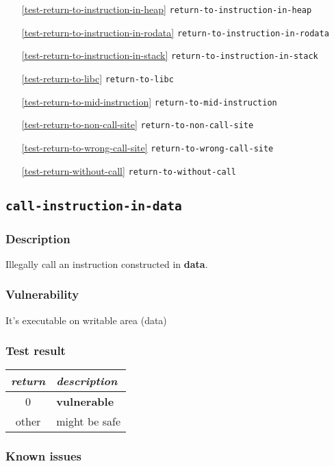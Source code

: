 \documentclass[a4paper]{book}
\begin{document}
\begin{itemize}[noitemsep]
\begin{itemize}[noitemsep, nolistsep, leftmargin=1em]
\begin{itemize}[noitemsep, nolistsep, leftmargin=1em]
    \item[\ref{test-return-to-instruction-in-heap}]   \texttt{return-to-instruction-in-heap}
    \item[\ref{test-return-to-instruction-in-rodata}] \texttt{return-to-instruction-in-rodata}
    \item[\ref{test-return-to-instruction-in-stack}]  \texttt{return-to-instruction-in-stack}
    \item[\ref{test-return-to-libc}]				  \texttt{return-to-libc}
    \item[\ref{test-return-to-mid-instruction}]		  \texttt{return-to-mid-instruction}
    \item[\ref{test-return-to-non-call-site}] 		  \texttt{return-to-non-call-site}
    \item[\ref{test-return-to-wrong-call-site}] 	  \texttt{return-to-wrong-call-site}    
    \item[\ref{test-return-without-call}] 		      \texttt{return-to-without-call}
    \end{itemize}
  \end{itemize}
\end{itemize}

\newpage
\subsection{\texttt{call-instruction-in-data}}\label{test-call-instruction-in-data}
\subsubsection{Description}
Illegally call an instruction constructed in \textbf{data}.
\subsubsection{Vulnerability}
It’s executable on writable area (data)
\subsubsection{Test result}
\begin{tabular}{cl}
  \toprule
  \emph{return}  & \emph{description} \\
  \midrule
  0              & \textbf{vulnerable} \\
  other          & might be safe \\
  \bottomrule
\end{tabular}
  
\subsubsection{Known issues}
\end{document}
